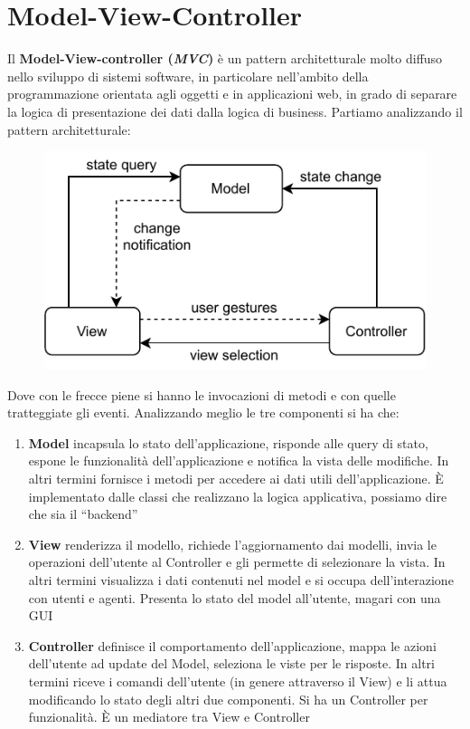 \documentclass[a4paper,12pt, oneside]{book}
\begin{document}
\chapter{Model-View-Controller}
Il \textbf{Model-View-controller (\textit{MVC})} è un pattern architetturale
molto diffuso nello sviluppo di sistemi software, in particolare nell'ambito
della programmazione orientata agli oggetti e in applicazioni web, in grado di
separare la logica di presentazione dei dati dalla logica di business. Partiamo
analizzando il pattern architetturale:
\begin{figure}[H]
  \centering
  \includegraphics[scale = 1.1]{img/mvc.pdf}
\end{figure}
Dove con le frecce piene si hanno le invocazioni di metodi e con quelle
tratteggiate gli eventi. Analizzando meglio le tre componenti si ha che:
\begin{enumerate}
  \item \textbf{Model} incapsula lo stato dell'applicazione, risponde alle query
  di stato, espone le funzionalità dell'applicazione e notifica la
  vista delle modifiche. In altri termini fornisce i metodi per
  accedere ai dati utili dell'applicazione. È implementato dalle classi che
  realizzano la logica applicativa, possiamo dire che sia il ``backend''
  \item \textbf{View} renderizza il modello, richiede l'aggiornamento dai
  modelli, invia le operazioni dell'utente al Controller e gli permette di
  selezionare la vista. In altri termini visualizza i dati contenuti nel model
  e si occupa dell'interazione con utenti e agenti. Presenta lo stato del model
  all'utente, magari con una GUI
  \item \textbf{Controller} definisce il comportamento dell'applicazione, mappa
  le azioni dell'utente ad update del Model, seleziona le viste per le
  risposte. In altri termini riceve i comandi dell'utente (in genere attraverso
  il View) e li attua modificando lo stato degli altri due componenti. Si ha un
  Controller per funzionalità. È un mediatore tra View e Controller
\end{enumerate}
\end{document}
